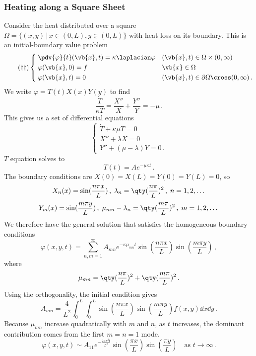\documentclass{article}
\theoremstyle{plain}\theoremheaderfont{\normalfont\itshape}\theorembodyfont{\rmfamily}\theoremseparator{.}\newtheorem*{rem}{Remark}\newtheorem*{ex}{Example}\newtheorem*{proof}{Proof}\newtheorem*{altp}{Alternative proof}
\theoremstyle{plain}\theoremheaderfont{\normalfont\bfseries}\theorembodyfont{\rmfamily}\theoremseparator{.}\newtheorem{thm}{Theorem}[section]\newtheorem{lem}[thm]{Lemma}\newtheorem{prop}[thm]{Proposition}\newtheorem*{cor}{Corollary}\newtheorem{defn}[thm]{Definition}\newtheorem{clm}[thm]{Claim}\newtheorem{clminproof}{Claim}
\theoremstyle{break}\theoremheaderfont{\normalfont\itshape}\theorembodyfont{\rmfamily}\theoremseparator{.\medskip}\newtheorem*{proofskip}{Proof}\newtheorem*{exs}{Examples}\newtheorem*{rems}{Remarks}
\theoremstyle{break}\theoremheaderfont{\normalfont\bfseries}\theorembodyfont{\rmfamily}\theoremseparator{.\medskip}\newtheorem{lemskip}[thm]{Lemma}\newtheorem{defnskip}[thm]{Definition}\newtheorem{propskip}[thm]{Proposition}\newtheorem{thmskip}[thm]{Theorem}
\numberwithin{equation}{section}
\begin{document}
	\subsubsection{Heating along a Square Sheet}
	Consider the heat distributed over a square \(\Omega=\{(x,y)\,|\,x\in(0,L),y\in(0,L)\}\) with heat loss on its boundary. This is an initial-boundary value problem
	\begin{equation}\tag{\(\dagger\dagger\)}
		\left\{\begin{aligned}
			& \;\pdv{\varphi}{t}(\vb{x},t)=\kappa\laplacian\varphi && (\vb{x},t)\in\Omega\times(0,\infty)\\
			& \;\varphi(\vb{x},0)=f && \vb{x}\in\Omega\\
			& \;\varphi(\vb{x},t)=0 && (\vb{x},t)\in\partial\Omega\cross(0,\infty)\,.
		\end{aligned}\right.
	\end{equation}
	We write \(\varphi=T(t)X(x)Y(y)\) to find
	\[\frac{\dot{T}}{\kappa T}=\frac{X''}{X}+\frac{Y''}{Y}=-\mu\,.\]
	This gives us a set of differential equations
	\[\begin{cases}
		\dot{T}+\kappa\mu T=0\\
		X''+\lambda X=0\\
		Y''+(\mu-\lambda)Y=0\,.
	\end{cases}\]
	\(T\) equation solves to
	\[T(t)=Ae^{-\mu\kappa t}\,.\]
	The boundary conditions are \(X(0)=X(L)=Y(0)=Y(L)=0\), so
	\[X_n(x)=\sin(\frac{n\pi x}{L})\,,\;\lambda_n=\qty(\frac{n\pi}{L})^2\,,\;n=1,2,\dots\]
	\[Y_m(x)=\sin(\frac{m\pi y}{L})\,,\;\mu_{mn}-\lambda_n=\qty(\frac{m\pi}{L})^2\,,\;m=1,2,\dots\]
	We therefore have the general solution that satisfies the homogeneous boundary conditions
	\[\varphi(x,y,t)=\sum_{n,m=1}^{\infty}A_{mn}e^{-\kappa\mu_{mn}t}\sin(\frac{n\pi x}{L})\sin(\frac{m\pi y}{L})\,,\]
	where
	\[\mu_{mn}=\qty(\frac{n\pi}{L})^2+\qty(\frac{m\pi}{L})^2\,.\]
	Using the orthogonality, the initial condition gives
	\[A_{mn}=\frac{4}{L^2}\int_{0}^{L}\int_{0}^{L}\sin(\frac{n\pi x}{L})\sin(\frac{m\pi y}{L})f(x,y)\dd{x}\dd{y}\,.\]
	Because \(\mu_{mn}\) increase quadratically with \(m\) and \(n\), as \(t\) increases, the dominant contribution comes from the first \(m=n=1\) mode.
	\[\varphi(x,y,t)\sim A_{11}e^{-\frac{2\kappa\pi^2 t}{L^2}}\sin(\frac{\pi x}{L})\sin(\frac{\pi y}{L})\quad\text{as }t\to\infty\,.\]
\end{document}
